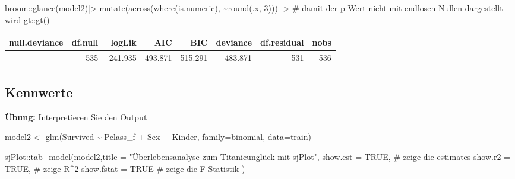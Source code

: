 \documentclass[
  10pt,
  letterpaper,
  a4paper, twoside]{scrreprt}
\newenvironment{Shaded}{\begin{snugshade}}{\end{snugshade}}
\newcommand{\AttributeTok}[1]{\textcolor[rgb]{0.40,0.45,0.13}{#1}}
\newcommand{\CommentTok}[1]{\textcolor[rgb]{0.37,0.37,0.37}{#1}}
\newcommand{\ConstantTok}[1]{\textcolor[rgb]{0.56,0.35,0.01}{#1}}
\newcommand{\DecValTok}[1]{\textcolor[rgb]{0.68,0.00,0.00}{#1}}
\newcommand{\FunctionTok}[1]{\textcolor[rgb]{0.28,0.35,0.67}{#1}}
\newcommand{\NormalTok}[1]{\textcolor[rgb]{0.00,0.23,0.31}{#1}}
\newcommand{\OtherTok}[1]{\textcolor[rgb]{0.00,0.23,0.31}{#1}}
\newcommand{\SpecialCharTok}[1]{\textcolor[rgb]{0.37,0.37,0.37}{#1}}
\newcommand{\StringTok}[1]{\textcolor[rgb]{0.13,0.47,0.30}{#1}}
\begin{document}
\begin{Shaded}
\begin{Highlighting}[]

\NormalTok{broom}\SpecialCharTok{::}\FunctionTok{glance}\NormalTok{(model2)}\SpecialCharTok{|\textgreater{}} 
 \FunctionTok{mutate}\NormalTok{(}\FunctionTok{across}\NormalTok{(}\FunctionTok{where}\NormalTok{(is.numeric), }\SpecialCharTok{\textasciitilde{}}\FunctionTok{round}\NormalTok{(.x, }\DecValTok{3}\NormalTok{))) }\SpecialCharTok{|\textgreater{}} \CommentTok{\# damit der p{-}Wert nicht mit endlosen Nullen dargestellt wird}
\NormalTok{  gt}\SpecialCharTok{::}\FunctionTok{gt}\NormalTok{()}
\end{Highlighting}
\end{Shaded}

\begin{longtable*}{rrrrrrrr}
\toprule
null.deviance & df.null & logLik & AIC & BIC & deviance & df.residual & nobs \\ 
\midrule{} & 535 & -241.935 & 493.871 & 515.291 & 483.871 & 531 & 536 \\ 
\bottomrule
\end{longtable*}

\subsection*{Kennwerte}\label{kennwerte}

\textbf{Übung:} Interpretieren Sie den Output

\begin{Shaded}
\begin{Highlighting}[]
\NormalTok{model2 }\OtherTok{\textless{}{-}} \FunctionTok{glm}\NormalTok{(Survived }\SpecialCharTok{\textasciitilde{}}\NormalTok{ Pclass\_f }\SpecialCharTok{+}\NormalTok{ Sex }\SpecialCharTok{+}\NormalTok{  Kinder,  }\AttributeTok{family=}\NormalTok{binomial, }\AttributeTok{data=}\NormalTok{train)}

\NormalTok{sjPlot}\SpecialCharTok{::}\FunctionTok{tab\_model}\NormalTok{(model2,}\AttributeTok{title =} \StringTok{"Überlebensanalyse zum Titanicunglück mit sjPlot"}\NormalTok{,}
                  \AttributeTok{show.est =} \ConstantTok{TRUE}\NormalTok{, }\CommentTok{\# zeige die estimates}
                  \AttributeTok{show.r2 =} \ConstantTok{TRUE}\NormalTok{, }\CommentTok{\# zeige R\^{}2}
                  \AttributeTok{show.fstat =} \ConstantTok{TRUE} \CommentTok{\# zeige die F{-}Statistik}
\NormalTok{                  )}
\end{Highlighting}
\end{Shaded}
\end{document}
